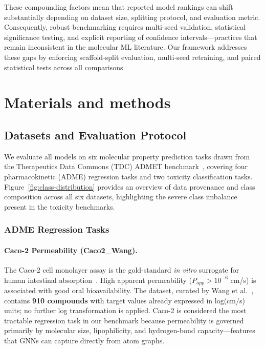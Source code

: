 \documentclass[12pt]{article}
\begin{document}
These compounding factors mean that reported model rankings can shift substantially depending on dataset size, splitting protocol, and evaluation metric. Consequently, robust benchmarking requires multi-seed validation, statistical significance testing, and explicit reporting of confidence intervals---practices that remain inconsistent in the molecular ML literature. Our framework addresses these gaps by enforcing scaffold-split evaluation, multi-seed retraining, and paired statistical tests across all comparisons.


\section{Materials and methods}

\subsection{Datasets and Evaluation Protocol}
\label{sec:datasets}

We evaluate all models on six molecular property prediction tasks drawn from the
Therapeutics Data Commons (TDC) ADMET benchmark~\cite{huang2021therapeuticsdatacommonsmachine},
covering four pharmacokinetic (ADME) regression tasks and two toxicity classification
tasks.  Figure~\ref{fig:class-distribution} provides an overview of data provenance
and class composition across all six datasets, highlighting the severe class
imbalance present in the toxicity benchmarks.

\subsubsection*{ADME Regression Tasks}

\paragraph{Caco-2 Permeability (Caco2\_Wang).}
The Caco-2 cell monolayer assay is the gold-standard \emph{in vitro} surrogate for
human intestinal absorption~\cite{artursson1991caco2}.  High apparent permeability
($P_{app} > 10^{-6}$ cm/s) is associated with good oral bioavailability.  The
dataset, curated by Wang et al.~\cite{wang2016admet}, contains \textbf{910 compounds}
with target values already expressed in log(cm/s) units; no further log transformation
is applied.  Caco-2 is considered the most tractable regression task in our benchmark
because permeability is governed primarily by molecular size, lipophilicity, and
hydrogen-bond capacity---features that GNNs can capture directly from atom graphs.
\end{document}
